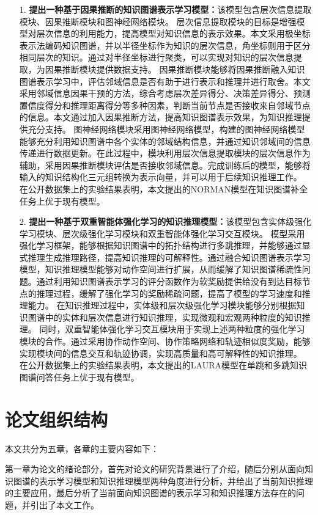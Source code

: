 \documentclass[algorithmlist, AutoFakeBold, AutoFakeSlant, figurelist, tablelist, nomlist, masters]{seuthesix}
\begin{document}
\begin{itemize}
  \item [1.]\textbf{提出一种基于因果推断的知识图谱表示学习模型：}该模型包含层次信息提取模块、因果推断模块和图神经网络模块。
  层次信息提取模块的目标是增强模型对层次信息的利用能力，提高模型对知识信息的表示效果。本文采用极坐标表示法编码知识图谱，并以半径坐标作为知识的层次信息，角坐标则用于区分相同层次的知识。通过对半径坐标进行聚类，可以实现对知识的层次信息提取，为因果推断模块提供数据支持。
  因果推断模块能够将因果推断融入知识图谱表示学习中，评估邻域信息是否有助于进行表示和推理并进行取舍。本文采用邻域信息因果干预的方法，综合考虑层次差异得分、决策差异得分、预测置信度得分和推理距离得分等多种因素，判断当前节点是否接收来自邻域节点的信息。本文通过加入因果推断方法，提高知识图谱表示效果，为知识推理提供充分支持。
  图神经网络模块采用图神经网络模型，构建的图神经网络模型能够充分利用知识图谱中各个实体的邻域结构信息，并通过知识邻域间的信息传递进行数据更新。在此过程中，模块利用层次信息提取模块的层次信息作为辅助，采用因果推断模块评估是否接收邻域信息。完成训练后的模型，能够将输入的知识结构化三元组转换为表示向量，并可以用于后续知识推理工作。
  在公开数据集上的实验结果表明，本文提出的NORMAN模型在知识图谱补全任务上优于现有模型。
  \item [2.]\textbf{提出一种基于双重智能体强化学习的知识推理模型：}该模型包含实体级强化学习模块、层次级强化学习模块和双重智能体强化学习交互模块。
  模型采用强化学习框架，能够根据知识图谱中的拓扑结构进行多跳推理，并能够通过显式推理生成推理路径，提高知识推理的可解释性。通过融合知识图谱表示学习模型，知识推理模型能够对动作空间进行扩展，从而缓解了知识图谱稀疏性问题。通过利用知识图谱表示学习的评分函数作为软奖励提供给没有到达目标节点的推理过程，缓解了强化学习的奖励稀疏问题，提高了模型的学习速度和推理能力。
  在知识推理过程中，实体级和层次级强化学习模块能够分别根据知识图谱中的实体和层次信息进行知识推理，实现微观和宏观两种粒度的知识推理。
  同时，双重智能体强化学习交互模块用于实现上述两种粒度的强化学习模块的合作。通过采用协作动作空间、协作策略网络和轨迹相似度奖励，能够实现模块间的信息交互和轨迹协调，实现高质量和高可解释性的知识推理。
  在公开数据集上的实验结果表明，本文提出的LAURA模型在单跳和多跳知识图谱问答任务上优于现有模型。
\end{itemize}


\section{论文组织结构}
本文共分为五章，各章的主要内容如下：

第一章为论文的绪论部分，首先对论文的研究背景进行了介绍，随后分别从面向知识图谱的表示学习模型和知识推理模型两种角度进行分析，并给出了当前知识推理的主要应用，最后分析了当前面向知识图谱的表示学习和知识推理方法存在的问题，并引出了本文工作。
\end{document}
